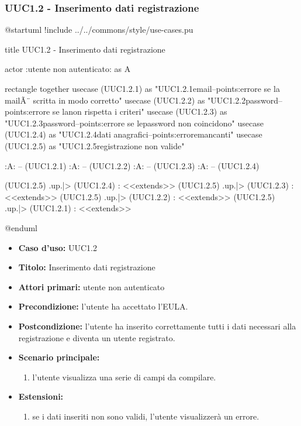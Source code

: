 \documentclass[casi-duso]{subfiles}
\begin{document}
\subsubsection{UUC1.2 - Inserimento dati registrazione}%
\label{subsub:UUC1.2utente}

\begin{plantuml}
@startuml
!include ../../commons/style/use-cases.pu
  
title UUC1.2 - Inserimento dati registrazione
  
actor :utente non autenticato: as A
  
rectangle {
  together {
    usecase (UUC1.2.1) as "UUC1.2.1\nRegistrazione email\n--\nExtension points:\nVisualizzazione errore se la mail\nnon Ã¨ scritta in modo corretto"
    usecase (UUC1.2.2) as "UUC1.2.2\nRegistrazione password\n--\nExtension points:\nVisualizzazione errore se la\npassword non rispetta i criteri" 
    usecase (UUC1.2.3) as "UUC1.2.3\nConferma password\n--\nExtension points:\nVisualizzazione errore se le\ndue password non coincidono"     
    usecase (UUC1.2.4) as "UUC1.2.4\nInserimento dati anagrafici\n--\nExtension points:\nVisualizzazione errore\ndati mancanti" 
    usecase (UUC1.2.5) as "UUC1.2.5\nInformazioni registrazione non valide"
  }
}
  
:A: -- (UUC1.2.1)
:A: -- (UUC1.2.2)
:A: -- (UUC1.2.3)
:A: -- (UUC1.2.4)
  
(UUC1.2.5) .up.|> (UUC1.2.4) : <<extends>>
(UUC1.2.5) .up.|> (UUC1.2.3) : <<extends>>
(UUC1.2.5) .up.|> (UUC1.2.2) : <<extends>>
(UUC1.2.5) .up.|> (UUC1.2.1) : <<extends>>
  
@enduml  
\end{plantuml}

\begin{itemize}
  \item \textbf{Caso d’uso:} UUC1.2
  \item \textbf{Titolo:} Inserimento dati registrazione
  \item \textbf{Attori primari:} utente non autenticato
  \item \textbf{Precondizione:} l'utente ha accettato l'EULA.
  \item \textbf{Postcondizione:} l'utente ha inserito correttamente tutti i dati necessari alla registrazione e diventa un utente registrato.
  \item \textbf{Scenario principale:}
        \begin{enumerate}
          \item l'utente visualizza una serie di campi da compilare.
        \end{enumerate}
  \item \textbf{Estensioni:}
        \begin{enumerate}
          \item se i dati inseriti non sono validi, l'utente visualizzerà un errore.
        \end{enumerate}
\end{itemize}
\end{document}
